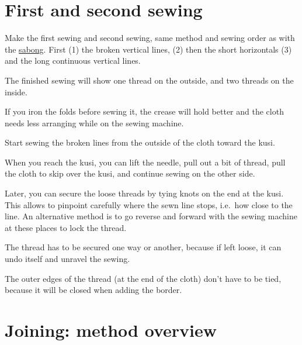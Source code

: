 
\setlength{\nextPhotoWidth}{0.6\textwidth}


\clearpage

\section{First and second sewing}

Make the first sewing and second sewing, same method and sewing order as
with the \href{/en/sabong-guide}{sabong}. First (1) the broken vertical
lines, (2) then the short horizontals (3) and the long continuous
vertical lines.

The finished sewing will show one thread on the outside, and two threads
on the inside.


If you iron the folds before sewing it, the crease will hold better and
the cloth needs less arranging while on the sewing machine.


Start sewing the broken lines from the outside of the cloth toward the
kusi.


When you reach the kusi, you can lift the needle, pull out a bit of
thread, pull the cloth to skip over the kusi, and continue sewing on the
other side.


Later, you can secure the loose threads by tying knots on the end at the
kusi. This allows to pinpoint carefully where the sewn line stops,
i.e.~how close to the line. An alternative method is to go reverse and
forward with the sewing machine at these places to lock the thread.

The thread has to be secured one way or another, because if left loose,
it can undo itself and unravel the sewing.

The outer edges of the thread (at the end of the cloth) don't have to be
tied, because it will be closed when adding the border.

\clearpage

\section{Joining: method overview}

